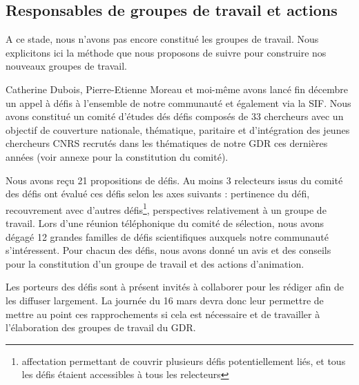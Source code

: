 \documentclass[11pt]{article}
\begin{document}
\subsection{Responsables de groupes de travail et actions}
A ce stade, nous n'avons pas encore constitué les groupes de travail.
Nous explicitons ici la méthode que nous proposons de suivre pour construire nos nouveaux groupes de travail.

Catherine Dubois, Pierre-Etienne Moreau et moi-même avons lancé fin décembre un appel à défis à l'ensemble de notre communauté et également via la SIF. 
Nous avons constitué un  comité d'études dés défis composés de 33 chercheurs avec un objectif de couverture nationale, thématique, paritaire et d'intégration des jeunes chercheurs CNRS recrutés dans les thématiques de notre GDR ces dernières années (voir annexe pour la constitution du comité). 

Nous avons reçu 21 propositions de défis.
Au moins 3 relecteurs issus du comité des défis ont évalué ces défis selon les axes suivants : pertinence du défi, recouvrement avec d'autres défis\footnote{affectation permettant de couvrir plusieurs défis potentiellement liés, et tous les défis étaient accessibles à tous les relecteurs}, perspectives relativement à un groupe de travail. Lors d'une réunion téléphonique du comité de sélection, nous avons dégagé 12 grandes familles de défis scientifiques auxquels notre communauté s'intéressent. Pour chacun des défis, nous avons donné un avis et des conseils pour la constitution d'un groupe de travail et des actions d'animation.

Les porteurs des défis sont à présent invités à collaborer pour les rédiger afin de les diffuser largement. La journée du 16 mars devra donc leur permettre de mettre au point ces rapprochements si cela est nécessaire et de travailler à l'élaboration des groupes de travail du GDR.
\end{document}
